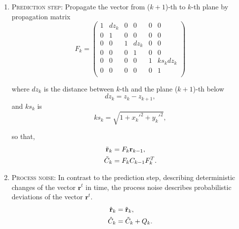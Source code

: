 \documentclass[a4paper]{book}
\let\vec\mathbf  %
\begin{document}
\begin{enumerate}
	\item \textsc{Prediction step:} Propagate the vector from ($k+1$)-th to $k$-th plane by propagation matrix
	\begin{equation}
	F_k = 
	\left(
	\begin{matrix}
	1 & dz_k & 0 & 0    & 0 & 0    \\
	0 & 1    & 0 & 0    & 0 & 0     \\
	0 & 0    & 1 & dz_k & 0 & 0      \\
	0 & 0    & 0 & 1    & 0 & 0       \\
	0 & 0    & 0 & 0    & 1 & ks_k dz_k\\
	0 & 0    & 0 & 0    & 0 & 1         \\
	\end{matrix}\right)
	\end{equation}
	
	where $dz_k$ is the distance between $k$-th and the plane ($k + 1$)-th below
	\begin{equation}
	dz_k = z_k - z_{k+1},
	\label{eq:dz}
	\end{equation}
	and $ks_k$ is
	\begin{equation}
	ks_k = \sqrt{1 + x_k'^2 + y_k'^2},
	\label{eq:ks}
	\end{equation}
	
	so that,
	\begin{align}
	\notag
	\tilde{\vec{r}}_k &= F_k \vec{r}_{k-1},\\
	\tilde{C}_k &= F_k C_{k-1} F_k^T.
	\label{eq:pred}
	\end{align}
	
	\item \textsc{Process noise:} In contrast to the prediction step, describing deterministic changes of the vector $\vec{r}^t$ in time, the process noise describes probabilistic deviations of the vector $\vec{r}^t$.
	\begin{align}
	\notag
	\hat{\vec{r}}_k &= \tilde{\vec{r}}_k,\\
	\hat{C}_k &= \tilde{C}_k + Q_k.
	\label{eq:rn}
	\end{align}
	

\end{enumerate}
\end{document}
